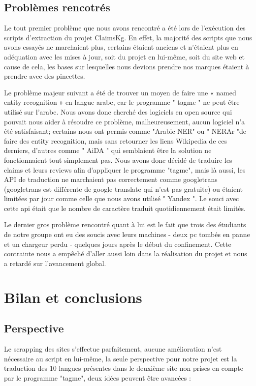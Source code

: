 \documentclass[oneside,13pt,a4paper]{report}
\begin{document}
\section{Problèmes rencotrés}

Le tout premier problème que nous avons rencontré a été lors de l'exécution des scripts d'extraction du projet ClaimsKg. En effet, la majorité des scripts que nous avons essayés ne marchaient plus, certains étaient anciens et n'étaient plus en adéquation avec les mises à jour, soit du projet en lui-même, soit du site web et cause de cela, les bases sur lesquelles nous devions prendre nos marques étaient à prendre avec des pincettes.

Le problème majeur suivant a été de trouver un moyen de faire une « named entity recognition » en langue arabe, car le programme " tagme " ne peut être utilisé sur l'arabe. Nous avons donc cherché des logiciels en open source qui pouvait nous aider à résoudre ce problème, malheureusement, aucun logiciel n'a été satisfaisant; certains nous ont permis comme "Arabic NER" ou " NERAr "de faire des entity recognition, mais sans retourner les liens Wikipedia de ces derniers, d'autres comme " AiDA " qui semblaient être la solution ne fonctionnaient tout simplement pas. Nous avons donc décidé de traduire les claims et leurs reviews afin d'appliquer le programme "tagme", mais là aussi, les API de traduction ne marchaient pas correctement comme googletrans (googletrans est différente de google translate qui n'est pas gratuite) ou étaient limitées par jour comme celle que nous avons utilisé " Yandex ". Le souci avec cette api était que le nombre de caractère traduit quotidiennement était limités.

Le dernier gros problème rencontré quant à lui est le fait que trois des étudiants de notre groupe ont eu des soucis avec leurs machines - deux pc tombés en panne et un chargeur perdu - quelques jours après le début du confinement. Cette contrainte nous a empêché d'aller aussi loin dans la réalisation du projet et nous a retardé sur l'avancement global.

\chapter{Bilan et conclusions}



\section{Perspective}
Le scrapping des sites s'effectue parfaitement, aucune amélioration n'est nécessaire au script en lui-même, la seule perspective pour notre projet est la traduction des 10 langues présentes dans le deuxième site non prises en compte par le programme "tagme", deux idées peuvent être avancées :
\end{document}

